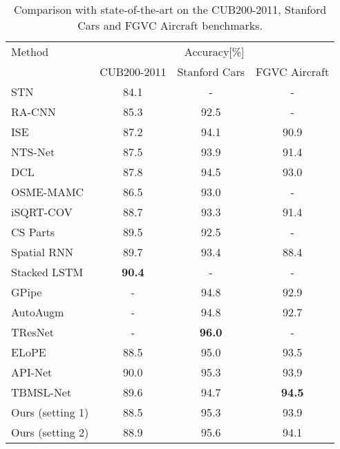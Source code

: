 \documentclass{bmvc2k}
\begin{document}
\begin{table}
  \begin{center}
  \begin{tabular} {|l|c|c|c|}
    \hline
    Method  & \multicolumn{3}{c|}{Accuracy[\%]} \\
    \cline{2-4}
            &  CUB200-2011 & Stanford Cars & FGVC Aircraft  \\
    \hline
    \hline
STN \cite{jaderberg2015spatial}      & 84.1 & -    & - \\
    RA-CNN \cite{fu2017look}             & 85.3 & 92.5 & - \\
    ISE \cite{simonelli2018increasingly} & 87.2 & 94.1 & 90.9 \\
    NTS-Net \cite{yang2018learning}      & 87.5 & 93.9 & 91.4 \\
    DCL \cite{Chen_2019_CVPR}            & 87.8 & 94.5 & 93.0 \\
    OSME-MAMC \cite{sun2018multi}        & 86.5 & 93.0 & - \\
    iSQRT-COV \cite{li2018towards}       & 88.7 & 93.3 & 91.4 \\
    CS Parts \cite{korsch2019class}      & 89.5 & 92.5 & - \\
    Spatial RNN \cite{wu2018deep}        & 89.7 & 93.4 & 88.4 \\
    Stacked LSTM \cite{Ge_2019_CVPR}     & \bf{90.4} & - & - \\
    GPipe \cite{huang2018gpipe}          & -    & 94.8 & 92.9 \\
    AutoAugm \cite{cubuk2018autoaugment} & -    & 94.8 & 92.7 \\
    TResNet \cite{ridnik2020tresnet}     & -    & \bf{96.0} & - \\
    ELoPE \cite{Hanselmann_2020_WACV}    & 88.5 & 95.0 & 93.5 \\
    API-Net \cite{zhuang2020learning}    & 90.0 & 95.3 & 93.9 \\
    TBMSL-Net \cite{zhang2020three}      & 89.6 & 94.7 & \bf{94.5} \\
    \hline
Ours (setting 1)     & 88.5 & 95.3 & 93.9 \\
    Ours (setting 2)     & 88.9 & 95.6 & 94.1 \\
    \hline
  \end{tabular}
  \end{center}
  \caption{Comparison with state-of-the-art on the CUB200-2011, Stanford Cars and FGVC Aircraft benchmarks. \label{table:e2e_sota}}

\end{table}
\end{document}

